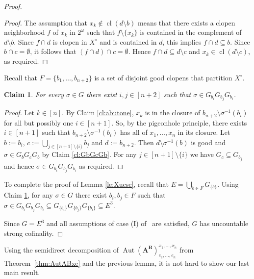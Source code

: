 \documentclass[12pt,a4paper,reqno]{amsart}
\numberwithin{equation}{section}
\theoremstyle{plain}
\newtheorem{claim}[thm]{Claim}
\theoremstyle{definition}
\newcommand*{\proofclaimname}{Proof}
\newenvironment{proofclaim}[1][\proofclaimname]{\begin{proof}[#1]\renewcommand*{\qedsymbol}{\(\diamond\)}}{\end{proof}}
\newcommand{\ABxe}{(\mathbf{A^B})^{x_1,\dots,x_n}_{e_1,\dots,e_n}}
\DeclareMathOperator{\Aut}{Aut}
\DeclareMathOperator{\cl}{cl}
\begin{document}
\begin{proof}
\begin{proofclaim}
 The assumption that $x_k\not\in \cl(d\setminus b)$ means that there exists a clopen neighborhood
 $f$ of $x_k$ in $2^\omega$ such that $f\setminus\{ x_k\}$ is contained in the complement of $d\setminus b$.
 Since $f\cap d$ is clopen in $X^\circ$ and is contained in $d$, this implies $f\cap d\subseteq b$.
Since $b\cap c=\emptyset$, it follows that $(f\cap d)\cap c=\emptyset$.
 Hence $f\cap d\subseteq d\setminus c$ and $x_k\in\cl(d\setminus c)$, as required.
\end{proofclaim}


Recall that $F=\{ b_1,\dots, b_{n+2}\}$ is a set of disjoint good clopens that partition $X^\circ$.

\begin{claim}\label{cl:pigeon}
For every $\sigma\in G$ there exist $i,j\in [n+2]$ such that $\sigma\in G_{b_i}G_{b_j}G_{b_i}$.
\end{claim}

\begin{proofclaim}
 Let $k\in [n]$. By Claim \ref{cl:abutone}, $x_k$ is in the closure of $b_{n+2}\setminus \sigma^{-1} (b_i)$
 for all but possibly one $i\in [n+1]$.
 So, by the pigeonhole principle, there exists $i\in [n+1]$ such that $b_{n+2}\setminus \sigma^{-1}(b_i)$ has all of
 $x_1,\dots,x_n$ in its closure.
 Let $b:= b_i$, $c:=\bigcup_{j\in [n+1]\setminus\{i\}} b_j$ and $d:=b_{n+2}$.
 Then $d\setminus\sigma^{-1}(b)$ is good and $\sigma\in G_bG_cG_b$ by Claim \ref{cl:GbGcGb}.
 For any $j\in [n+1]\setminus\{i\}$ we have $G_c \subseteq G_{b_j}$ and hence $\sigma\in G_{b_i} G_{b_j} G_{b_i}$
 as required.
\end{proofclaim}

To complete the proof of Lemma \ref{le:Xucsc}, recall that $E=\bigcup_{b\in F} G_{\{b\}}$.
Using Claim \ref{cl:pigeon}, for any $\sigma\in G$ there exist $b_i,b_j\in F$ such that
$\sigma\in G_{b_i} G_{b_j} G_{b_i}\subseteq G_{\{b_i\}} G_{\{b_j\}} G_{\{b_i\}}\subseteq E^3$.

 Since $G = E^3$ and all assumptions of case (I) of~\cite[Theorem 2.8]{DG:UCPG} are satisfied,
 $G$ has uncountable strong cofinality.
\end{proof}




 Using the semidirect decomposition of $\Aut\ABxe$ from Theorem~\ref{thm:AutABxe} and the previous lemma,
 it is not hard to show our last main result.
\end{document}
